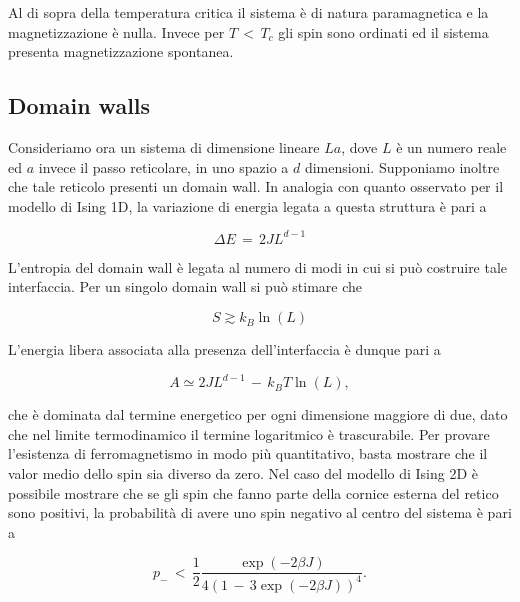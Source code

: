 Al di sopra della temperatura critica il sistema è di natura paramagnetica e la magnetizzazione è nulla. Invece per $T\,<\,T_c$ gli 
spin sono ordinati ed il sistema presenta magnetizzazione spontanea.



\subsection{Domain walls}


Consideriamo ora un sistema di dimensione lineare $La$, dove $L$ è un numero reale ed $a$ invece il passo reticolare, in uno spazio a $d$ dimensioni. 
Supponiamo inoltre che tale reticolo presenti un domain wall. In analogia con quanto osservato per il modello di Ising 1D, la 
variazione di energia legata a questa struttura è pari a 

\begin{equation}
    \Delta E\,=\,2JL^{d-1}
    \label{eq: ene_dw_IsingdD}
\end{equation}

L'entropia del domain wall è legata al numero di modi in cui si può costruire tale interfaccia. Per un singolo domain wall si può 
stimare che 

\begin{equation}
    S \gtrsim k_B \ln{\left(L\right)}
    \label{eq: entr_dw_IsingdD}
\end{equation}

L'energia libera associata alla presenza dell'interfaccia è dunque pari a 

\begin{equation}
    A \simeq 2JL^{d-1}\,-\,k_B T\ln{\left(L\right)},
    \label{eq: freeE_dw_IsingdD}
\end{equation}

che è dominata dal termine energetico per ogni dimensione maggiore di due, dato che nel limite termodinamico il termine 
logaritmico è trascurabile. Per provare l'esistenza di ferromagnetismo in modo più quantitativo, basta mostrare che il valor medio 
dello spin sia diverso da zero. Nel caso del modello di Ising 2D è possibile mostrare che se gli spin che fanno parte della cornice 
esterna del retico sono positivi, la probabilità di avere uno spin negativo al centro del sistema è pari a 

\begin{equation}
    p_{-}\,<\,\frac{1}{2}\frac{\exp{\left(-2\beta J\right)}}{4 \left(1\,-\,3\exp{\left(-2\beta J\right)}\right)^4}.
    \label{eq: probm_Ising2D}
\end{equation}

